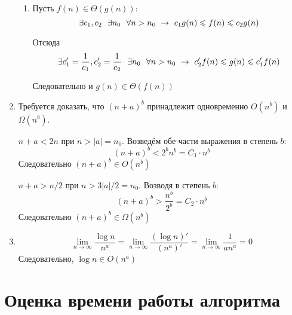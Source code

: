 \documentclass[12pt]{extarticle}
\providecommand{\abs}[1]{\left\lvert{#1}\right\rvert}
\begin{document}
\begin{enumerate}
\begin{enumerate}
      \item Пусть $f(n) \in \Theta(g(n))$:
      $$
      \exists c_1, c_2 ~~ \exists n_0 ~~ \forall n > n_0 ~\to~ c_1 g(n) \leqslant f(n) \leqslant c_2 g(n) \\
      $$

      Отсюда
      $$
      \exists c'_1=\frac{1}{c_1}, c'_2=\frac{1}{c_2} ~~ \exists n_0 ~~ \forall n > n_0
      ~\to~ c'_2 f(n) \leqslant g(n) \leqslant c'_1 f(n) \\
      $$

      Следовательно и $g(n) \in \Theta(f(n))$
    \end{enumerate}

  \item Требуется доказать, что $(n+a)^b$ принадлежит одновременно $O(n^b)$ и $\Omega(n^b)$.
  
  $n+a < 2n$ при $n > \abs{a} = n_0$. Возведём обе части выражения в степень $b$:
    $$
    (n+a)^b < 2^b n^b = C_1 \cdot n^b
    $$ Следовательно $(n+a)^b \in O(n^b)$
    
    $n+a > n/2$ при $n > 3\abs{a}/2 = n_0$. Возводя в степень $b$:
    $$
    (n+a)^b > \frac{n^b}{2^b} = C_2 \cdot n^b
    $$ Следовательно $(n+a)^b \in \Omega(n^b)$

  \item

    $$
    \lim_{n\to\infty} \frac{\log n}{n^a} = \lim_{n\to\infty} \frac{(\log n)'}{(n^a)'}
    = \lim_{n\to\infty} \frac{1}{an^a} = 0
    $$
    Следовательно, $\log n \in O(n^a)$
\end{enumerate}


\section{Оценка времени работы алгоритма}
\end{document}
